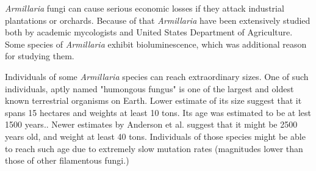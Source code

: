 \documentclass[two column, twoside, a4paper]{article}
\begin{document}
\textit{Armillaria} fungi can cause serious economic losses if they attack industrial plantations or orchards. Because of that \textit{Armillaria} have been extensively studied both by academic mycologists and United States Department of Agriculture\autocite{Shaw1991}. Some species of \textit{Armillaria} exhibit bioluminescence, which was additional reason for studying them.\autocite{Ke2020, Oliveira2015}

Individuals of some \textit{Armillaria} species can reach extraordinary sizes. One of such individuals, aptly named "humongous fungus" is one of the largest and oldest known terrestrial organisms on Earth. Lower estimate of its size suggest that it spans 15 hectares and weights at least 10 tons. Its age was estimated to be at lest 1500 years.\autocite{Smith1992}. Newer estimates by Anderson et al. suggest that it might be 2500 years old, and weight at least 40 tons\autocite{Anderson2018}. Individuals of those species might be able to reach such age due to extremely slow mutation rates (magnitudes lower than those of other filamentous fungi\autocite{Anderson2014}.)
\end{document}
